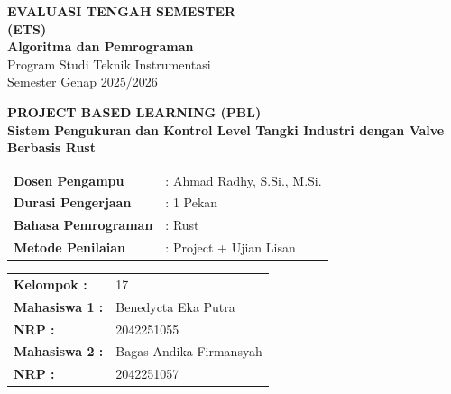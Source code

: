 \documentclass[12pt,a4paper]{article}
\begin{document}
\begin{titlepage}
    \centering
    
    {\LARGE \textbf{EVALUASI TENGAH SEMESTER}} \\[0.2cm]
    {\LARGE \textbf{(ETS)}} \\[0.5cm]
    
    {\Large \textbf{Algoritma dan Pemrograman}} \\[0.8cm]
    
    {\large Program Studi Teknik Instrumentasi} \\[0.2cm]
    {\large Semester Genap 2025/2026} \\[1.5cm]
    
    \begin{tcolorbox}[
        colback=boxblue, 
        colframe=borderblue, 
        width=0.9\textwidth, 
        arc=5pt, 
        boxrule=1pt,
        center title,
        halign=center
    ]
        \centering
        \textbf{\large PROJECT BASED LEARNING (PBL)} \\[0.3cm]
        \textbf{ Sistem  Pengukuran dan Kontrol Level Tangki Industri dengan Valve \\ Berbasis Rust}
    \end{tcolorbox}
    
    \vfill 
    
    \begin{flushleft}
    \hspace{2.5cm} 
    \begin{tabular}{ll}
        \textbf{Dosen Pengampu}  & : Ahmad Radhy, S.Si., M.Si. \\
        \textbf{Durasi Pengerjaan} & : 1 Pekan \\
        \textbf{Bahasa Pemrograman} & : Rust \\
        \textbf{Metode Penilaian}  & : Project + Ujian Lisan \\
    \end{tabular}
    \end{flushleft}
    
    \vspace{1.5cm}
    
    \begin{flushleft}
    \hspace{2.5cm}
    \begin{tabular}{ll}
        \textbf{Kelompok :} & 17 \\[0.3cm] 
        \textbf{Mahasiswa 1 :} & Benedycta Eka Putra  \\[0.1cm]
        \textbf{NRP :} & 2042251055  \\[0.3cm]
        \textbf{Mahasiswa 2 :} & Bagas Andika Firmansyah  \\[0.1cm]
        \textbf{NRP :} & 2042251057  \\
    \end{tabular}
    \end{flushleft}
    

\end{titlepage}
\end{document}
